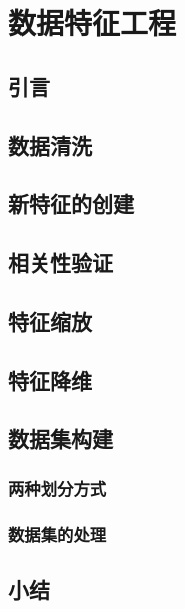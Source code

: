 \chapter{数据特征工程}
\section{引言}

\section{数据清洗}
\section{新特征的创建}
\section{相关性验证}
\section{特征缩放}
\section{特征降维}
\section{数据集构建}
\subsection{两种划分方式}
\subsection{数据集的处理}
\section{小结}